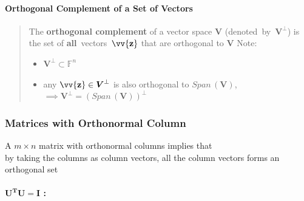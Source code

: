 \documentclass[11pt]{article}
\DeclareRobustCommand{\myvec}[1]{\vv{\mathbf{#1}}}
\newcommand{\mysubvecsp}[1]{\bm{{#1}}}
\newcommand{\mymat}[1]{#1}
\begin{document}
    \paragraph{Orthogonal Complement of a Set of Vectors} 
    \begin{quote}
        The \textbf{orthogonal complement} of a vector space $\mysubvecsp{V}$ (denoted~by~$\mysubvecsp{V}^{\perp}$) is the set of \textbf{all}~vectors~$\myvec{z}$ that are orthogonal to $\mysubvecsp{V}$
        \vspace{1ex}
        Note:
        \begin{itemize}
            \item $\mysubvecsp{V}^{\perp} \subset \mathbb{F}^n$
            \item any $\myvec{z} \in \mysubvecsp{V}^{\perp}$ is also orthogonal to $Span\,(\mysubvecsp{V})$, $\implies \mysubvecsp{V}^{\perp} = (Span\,(\mysubvecsp{V}))^{\perp}$
        \end{itemize}
    \end{quote}
    
    \newpage
    \subsubsection{Matrices with Orthonormal Column} \label{section3_5_3}
    A $m \times n$ matrix with orthonormal columns implies that \\
    by taking the columns as column vectors, all the column vectors forms an orthogonal set
    
    \paragraph{$\bm{\mymat{U}^T \mymat{U} = \mymat{I}}$ :}\mbox{}\vspace{1ex}
\end{document}
